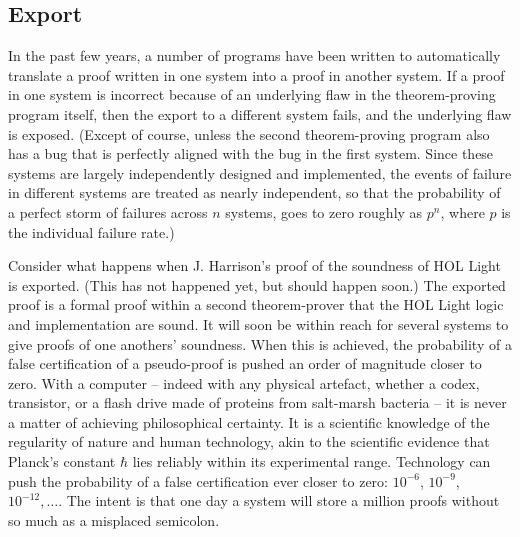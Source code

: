 \documentclass{llncs}
\begin{document}
\subsection{Export}

In the past few years, a number of
programs have been written to automatically translate a proof written in one system into
a proof in another system.  If a proof in one system is incorrect because of an underlying
flaw in the theorem-proving program itself, then the export to
a different system fails, and the underlying flaw is exposed.  (Except of course,
unless the second theorem-proving program also has a bug that is perfectly aligned with the
bug in the first system.  Since these systems are largely independently designed and implemented, 
the events of failure in different systems are
treated as nearly independent, so that the probability of a perfect
storm of failures across $n$ systems, goes to zero roughly as $p^n$, where $p$ is the individual
failure rate.)

Consider what happens when J. Harrison's proof of the soundness of HOL Light is exported.
(This has not happened yet, but should happen soon.)
The exported proof is a formal proof within a second theorem-prover that the HOL Light logic and implementation are sound.  
It will soon be within reach for several systems to give proofs
of one anothers' soundness.  When this is achieved, the probability of a false certification
of a pseudo-proof is pushed an order of magnitude closer to zero.  With a computer -- indeed with any physical artefact, whether a codex, transistor, or a flash drive made of proteins from salt-marsh bacteria --
it is never a matter of achieving philosophical certainty.
It is a scientific knowledge of the regularity of nature and human technology, akin to the scientific evidence
that Planck's constant $\hbar$ lies reliably within its experimental range.
Technology can push the probability of a false certification
ever closer to zero: $10^{-6}$, $10^{-9}$, $10^{-12},\ldots$. The intent
is 
that one day a system will store a million proofs without so much as a misplaced
semicolon.
\end{document}
